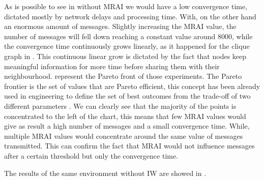 As is possible to see in 
without \ac{MRAI} we would have a low convergence time, dictated mostly by 
network delays and processing time. With, on the other hand an enormous amount
of messages.
Slightly increasing the \ac{MRAI} value, the number of messages will fell down
reaching a constant value around \num{8000}, while the convergence time
continuously grows linearly, as it happened for the clique graph in .
This continuous linear grow is dictated by the fact that nodes keep meaningful
information for more time before sharing them with their neighbourhood.
 represent the Pareto
front of those experiments.
The Pareto frontier is the set of values that are Pareto efficient, this concept
has been already used in engineering to define the set of best outcomes from
the trade-off of two different parameters \cite{goodarzi2014introduction}.
We can clearly see that the majority of the points is concentrated to the left
of the chart, this means that few \ac{MRAI} values would give as result
a high number of messages and a small convergence time.
While, multiple \ac{MRAI} values would concentrate around the same value of 
messages transmitted.
This can confirm the fact that \ac{MRAI} would not influence messages
after a certain threshold but only the convergence time.

The results of the same environment without \ac{IW} are showed in 
.

